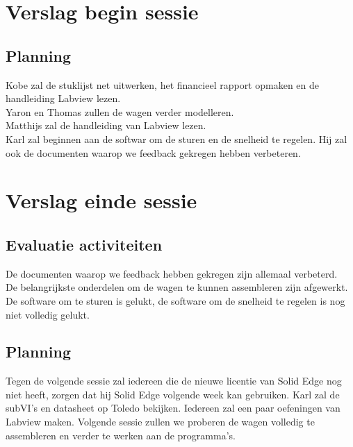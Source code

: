 \documentclass[12pt]{article}
\begin{document}
	\section{Verslag begin sessie}
	
	\subsection{Planning}
	Kobe zal de stuklijst net uitwerken, het financieel rapport opmaken en de handleiding Labview  lezen.\\
	Yaron en Thomas zullen de wagen verder modelleren.\\
	Matthijs zal de handleiding van Labview lezen.\\
	Karl zal beginnen aan de softwar om de sturen en de snelheid te regelen. Hij zal ook de documenten waarop we feedback gekregen hebben verbeteren.	
	
	
	\section{Verslag einde sessie}

	
	\subsection{Evaluatie activiteiten}
	De documenten waarop we feedback hebben gekregen zijn allemaal verbeterd.\\ De belangrijkste onderdelen om de wagen te kunnen assembleren zijn afgewerkt.\\ De software om te sturen is gelukt, de software om de snelheid te regelen is nog niet volledig gelukt.
	
	\subsection{Planning}
	Tegen de volgende sessie zal iedereen die de nieuwe licentie van Solid Edge nog niet heeft, zorgen dat hij Solid Edge volgende week kan gebruiken.
	Karl zal de subVI's en datasheet op Toledo bekijken.
	Iedereen zal een paar oefeningen van Labview maken.
	Volgende sessie zullen we proberen de wagen volledig te assembleren en verder te werken aan de programma's.
	
	
	
\end{document}
